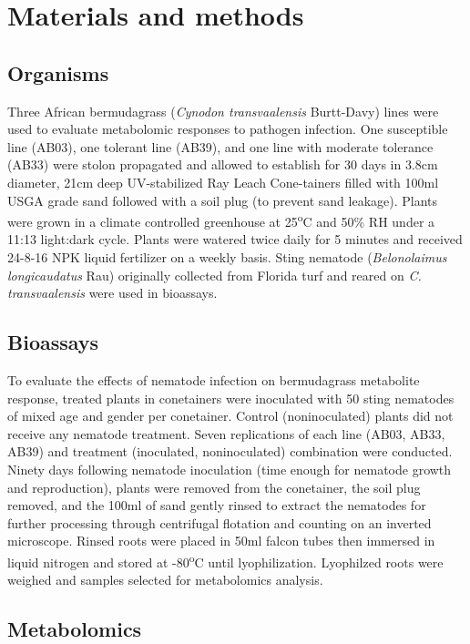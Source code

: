 \documentclass[9pt,lineno]{elife}
\begin{document}
\section{Materials and methods}


\subsection{Organisms}

Three African bermudagrass (\textit{Cynodon transvaalensis} Burtt-Davy) lines were used to evaluate metabolomic responses to pathogen infection.  One susceptible line (AB03), one tolerant line (AB39), and one line with moderate tolerance (AB33) were stolon propagated and allowed to establish for 30 days in 3.8cm diameter, 21cm deep UV-stabilized Ray Leach Cone-tainers filled with 100ml USGA grade sand followed with a soil plug (to prevent sand leakage). Plants were grown in a climate controlled greenhouse at 25\textsuperscript{o}C and 50\% RH under a 11:13 light:dark cycle.  Plants were watered twice daily for 5 minutes and received 24-8-16 NPK liquid fertilizer on a weekly basis.  Sting nematode (\textit{Belonolaimus longicaudatus} Rau) originally collected from Florida turf and reared on \textit{C. transvaalensis} were used in bioassays. 

\subsection{Bioassays}

To evaluate the effects of nematode infection on bermudagrass metabolite response, treated plants in conetainers were inoculated with 50 sting nematodes of mixed age and gender per conetainer.  Control (noninoculated) plants did not receive any nematode treatment. Seven replications of each line (AB03, AB33, AB39) and treatment (inoculated, noninoculated) combination were conducted.  Ninety days following nematode inoculation (time enough for nematode growth and reproduction), plants were removed from the conetainer, the soil plug removed, and the 100ml of sand gently rinsed to extract the nematodes for further processing through centrifugal flotation and counting on an inverted microscope.  Rinsed roots were placed in 50ml falcon tubes then immersed in liquid nitrogen and stored at -80\textsuperscript{o}C until lyophilization.  Lyophilzed roots were weighed and samples selected for metabolomics analysis. 

\subsection{Metabolomics}
\end{document}
